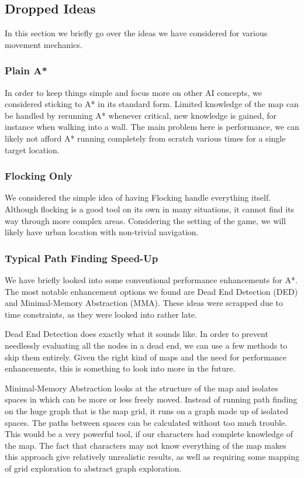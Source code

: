 \subsection{Dropped Ideas}
In this section we briefly go over the ideas we have considered for various movement mechanics. 

\subsubsection{Plain A*}
In order to keep things simple and focus more on other AI concepts, we considered sticking to A* in its standard form. Limited knowledge of the map can be handled by rerunning A* whenever critical, new knowledge is gained, for instance when walking into a wall. The main problem here is performance, we can likely not afford A* running completely from scratch various times for a single target location. 

\subsubsection{Flocking Only}
We considered the simple idea of having Flocking handle everything itself. Although flocking is a good tool on its own in many situations, it cannot find its way through more complex areas. Considering the setting of the game, we will likely have urban location with non-trivial navigation.

\subsubsection{Typical Path Finding Speed-Up}
We have briefly looked into some conventional performance enhancements for A*. The most notable enhancement options we found are Dead End Detection (DED) and Minimal-Memory Abstraction (MMA). These ideas were scrapped due to time constraints, as they were looked into rather late. 

Dead End Detection does exactly what it sounds like. In order to prevent needlessly evaluating all the nodes in a dead end, we can use a few methods to skip them entirely. Given the right kind of maps and the need for performance enhancements, this is something to look into more in the future.

Minimal-Memory Abstraction looks at the structure of the map and isolates spaces in which can be more or less freely moved. Instead of running path finding on the huge graph that is the map grid, it runs on a graph made up of isolated spaces. The paths between spaces can be calculated without too much trouble. This would be a very powerful tool, if our characters had complete knowledge of the map. The fact that characters may not know everything of the map makes this approach give relatively unrealistic results, as well as requiring some mapping of grid exploration to abstract graph exploration.

